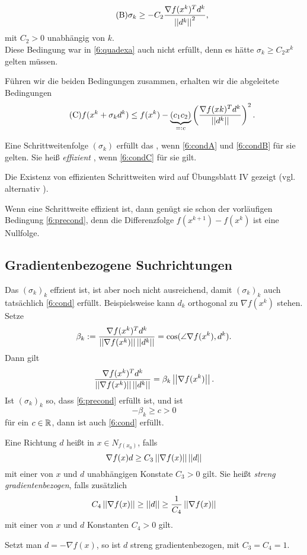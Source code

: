 	\begin{equation}\tag{B}\label{6:condB}
		\sigma_k \geq -C_2 \frac{\nabla f(x^k)^Td^k}{\left|\left|d^k\right|\right|^2},
	\end{equation} 
	mit $C_2>0$ unabhängig von $k$.\\
	Diese Bedingung war in \cref{6:quadexa} auch nicht erfüllt, denn es hätte $\sigma_k\geq C_2x^k$ gelten müssen.\par 
	Führen wir die beiden Bedingungen zusammen, erhalten wir die abgeleitete Bedingungen
	\begin{equation}\label{6:condC}\tag{C}
		f(x^k+\sigma_kd^k)\leq f(x^k) - \underbrace{(c_1c_2)}_{=:c}\left(\frac{\nabla f(x k)^Td^k}{\left|\left|d^k\right|\right|}\right)^2.
	\end{equation}

\begin{defn}
	Eine Schrittweitenfolge $(\sigma_k)$ erfüllt das , wenn \eqref{6:condA} und \eqref{6:condB} für sie gelten. Sie heiß \emph{effizient} , wenn \eqref{6:condC} für sie gilt.
\end{defn}
Die Existenz von effizienten Schrittweiten wird auf Übungsblatt IV gezeigt (vgl. alternativ \cite[78]{alt2002nichtlineare}).\par 
Wenn eine Schrittweite effizient ist, dann genügt sie schon der vorläufigen Bedingung \eqref{6:precond}, denn die Differenzfolge $f(x^{k+1})-f(x^k)$ ist eine Nullfolge.
\subsection{Gradientenbezogene Suchrichtungen} 
Das $(\sigma_k)_k$ effzient ist, ist aber noch nicht ausreichend, damit $(\sigma_k)_k$ auch tatsächlich \eqref{6:cond} erfüllt. Beispielsweise kann $d_k$ orthogonal zu $\nabla f(x^k)$ stehen. \\
Setze 
\[
\beta_k := \frac{\nabla f(x^k)^Td^k}{\left|\left|\nabla f(x^k)\right|\right|\left|\left|d^k\right|\right|}= \cos (\angle \nabla f(x^k),d^k).
\]
Dann gilt
\[
\frac{\nabla f(x^k)^Td^k}{\left|\left|\nabla f(x^k)\right|\right|\left|\left|d^k\right|\right|} = \beta_k \left|\left|\nabla f(x^k)\right|\right|.
\]
Ist $(\sigma_k)_k$ so, dass \eqref{6:precond} erfüllt ist, und ist 
\[
-\beta_k\geq c>0
\]
für ein $c\in \mathbb{R}$, dann ist auch \eqref{6:cond} erfüllt.
\begin{defn}
	Eine Richtung $d$ heißt  in $x\in N_{f(x_0)}$, falls
	\[
		\nabla f(x)d \geq C_3\left|\left|\nabla f(x)\right|\right|\left|\left|d\right|\right|
	\]
	mit einer von $x$ und $d$ unabhängigen Konstate $C_3>0$ gilt. Sie heißt \emph{streng gradientenbezogen}, falls zusätzlich 
	\[
		C_4\left|\left|\nabla f(x)\right|\right|\geq \left|\left|d\right|\right|\geq \frac{1}{C_4}\left|\left|\nabla f(x)\right|\right|
	\]
	mit einer von $x$ und $d$ Konstanten $C_4>0$ gilt. 
\end{defn}
\begin{rem}
	Setzt man $d = - \nabla f(x)$, so ist $d$ streng gradientenbezogen, mit $C_3=C_4=1$.
\end{rem}
